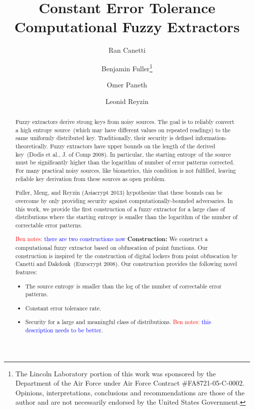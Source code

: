 \documentclass[11pt]{article}
\title{Constant Error Tolerance Computational Fuzzy Extractors}
\author{Ran Canetti \and Benjamin Fuller\footnote{The Lincoln Laboratory portion of this
work was sponsored by the Department of the Air Force under Air Force
Contract
\#FA8721-05-C-0002.  Opinions,
interpretations, conclusions and recommendations are those of the author
and
are not necessarily endorsed by the United States Government.} \and Omer Paneth \and Leonid Reyzin}
\newcommand{\authnote}[2]{{\textcolor{red}{\textsf{#1 notes: }\textcolor{blue}{ #2}}\marginpar{\textcolor{red}{\textbf{!!!!!}}}}}
\newcommand{\authnote}[2]{}
\newcommand{\bnote}[1]{{\authnote{Ben}{#1}}}
\begin{document}
\maketitle


\begin{abstract}
Fuzzy extractors derive strong keys from noisy sources.  The goal is to reliably convert a high entropy source~(which may have different values on repeated readings) to the same uniformly distributed key.  Traditionally, their security is defined information-theoretically.  Fuzzy extractors have upper bounds on the length of the derived key~(Dodis et al., J. of Comp 2008).  In particular, the starting entropy of the source must be significantly higher than the logarithm of number of error patterns corrected.  For many practical noisy sources, like biometrics, this condition is not fulfilled, leaving reliable key derivation from these sources as open problem.

Fuller, Meng, and Reyzin (Asiacrypt 2013) hypothesize that these bounds can be overcome by only providing security against computationally-bounded adversaries.
In this work, we provide the first construction of a fuzzy extractor for a large class of distributions where the starting entropy is smaller than the logarithm of the number of correctable error patterns.

\bnote{there are two constructions now}
\textbf{Construction:} We construct a computational fuzzy extractor based on obfuscation of point functions.
Our construction is inspired by the construction of digital lockers from point obfuscation by Canetti and Dakdouk~(Eurocrypt 2008).
Our construction provides the following novel features:
\begin{itemize}
\item The source entropy is smaller than the log of the number of correctable error patterns.
\item Constant error tolerance rate.
\item Security for a large and meaningful class of distributions.  \bnote{this description needs to be better}.
\end{itemize}
\end{abstract}
\end{document}
